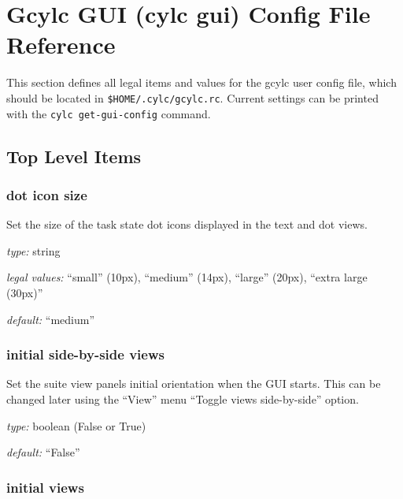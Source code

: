 
\section{Gcylc GUI (cylc gui) Config File Reference}
\label{GcylcRCReference}

\lstset{language=bash}

This section defines all legal items and values for the gcylc user
config file, which should be located in
\lstinline=$HOME/.cylc/gcylc.rc=.
Current settings can be printed with the \lstinline=cylc get-gui-config=
command.

\subsection{Top Level Items}

\subsubsection{dot icon size}

Set the size of the task state dot icons displayed in the text and dot
views.

\begin{myitemize}
\item {\em type:} string
\item {\em legal values:} ``small'' (10px), ``medium'' (14px), ``large'' (20px),
        ``extra large (30px)''
\item {\em default:} ``medium''
\end{myitemize}


\subsubsection{initial side-by-side views}

Set the suite view panels initial orientation when the GUI starts.
This can be changed later using the ``View'' menu ``Toggle views side-by-side''
 option.

\begin{myitemize}
\item {\em type:} boolean (False or True)
\item {\em default:} ``False''
\end{myitemize}

\subsubsection{initial views}

